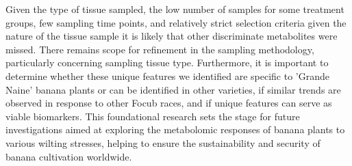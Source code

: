 Given the type of tissue sampled, the low number of samples for some treatment groups, few sampling time points, and relatively strict selection criteria given the nature of the tissue sample it is likely that other discriminate metabolites were missed. There remains scope for refinement in the sampling methodology, particularly concerning sampling tissue type. Furthermore, it is important to determine whether these unique features we identified are specific to 'Grande Naine' banana plants or can be identified in other varieties, if similar trends are observed in response to other \ac{Focub} races, and if unique features can serve as viable biomarkers. This foundational research sets the stage for future investigations aimed at exploring the metabolomic responses of banana plants to various wilting stresses, helping to ensure the sustainability and security of banana cultivation worldwide. 






